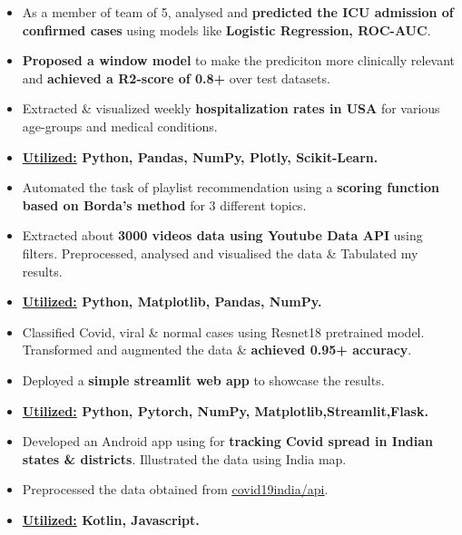 \documentclass[10pt,a4paper,ragged2e,withhyper]{altacv}
\begin{document}
\begin{paracol}{2}
\begin{itemize}
  \item As a member of team of 5, analysed and \textbf{predicted the ICU admission of confirmed cases} using models like \textbf{Logistic Regression, ROC-AUC}.
  \item \textbf{Proposed a window model} to make the prediciton more clinically relevant and \textbf{achieved a R2-score of 0.8+} over test datasets.
  \item Extracted \& visualized weekly \textbf{hospitalization rates in USA} for various age-groups and medical conditions. 
  \item \textbf{\underline{Utilized:} Python, Pandas, NumPy, Plotly, Scikit-Learn.}
\end{itemize}
\divider


\begin{itemize}
\item Automated the task of playlist recommendation using a \textbf{scoring function based on Borda's method} for 3 different topics.
\item Extracted about \textbf{3000 videos data using Youtube Data API} using filters. Preprocessed, analysed and visualised the data \& Tabulated my results.
\item \textbf{\underline{Utilized:} Python, Matplotlib, Pandas, NumPy.}
\end{itemize}
\divider

\begin{itemize}
    \item Classified Covid, viral \& normal cases using Resnet18 pretrained model. Transformed and augmented the data \& \textbf{achieved 0.95+ accuracy}.
    \item Deployed a \textbf{simple streamlit web app} to showcase the results.
    \item \textbf{\underline{Utilized:} Python, Pytorch, NumPy, Matplotlib,Streamlit,Flask.}
\end{itemize}
\divider

\begin{itemize}
\item Developed an Android app using for \textbf{tracking Covid spread in Indian states \& districts}. Illustrated the data using India map. 
\item Preprocessed the data obtained from \href{https://github.com/covid19india/api}{\underline{covid19india/api}}.
\item \textbf{\underline{Utilized:} Kotlin, Javascript.}
\end{itemize}
\divider


\end{paracol}
\end{document}
